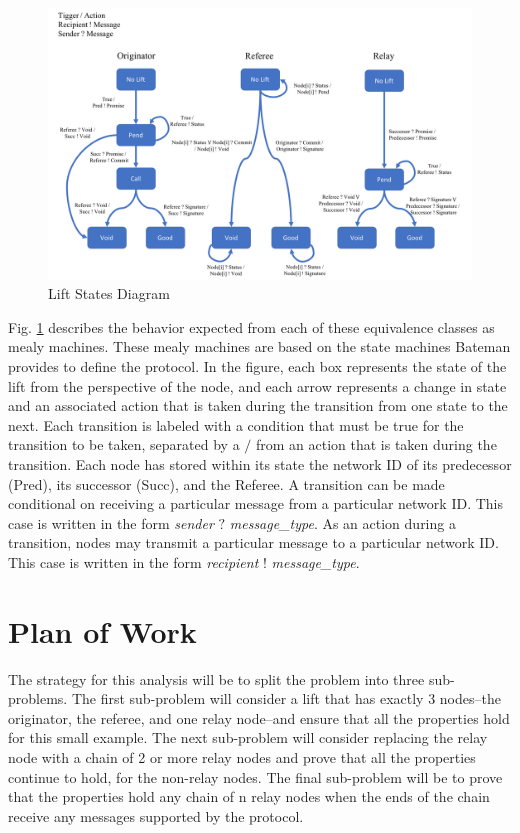 \documentclass[article, onecolumn, 12pt]{IEEEtran}
\begin{document}
\begin{figure}
    \centering
    \includegraphics[scale=0.5]{LiftStatesSeperate.png}
    \caption{Lift States Diagram}
    \label{fig:liftStates}
\end{figure}

Fig. \ref{fig:liftStates} describes the behavior expected from each of these equivalence classes as mealy machines.
These mealy machines are based on the state machines Bateman provides to define the protocol. \cite{bateman_state_machines} 
In the figure, each box represents the state of the lift from the perspective of the node, and each arrow represents a change in state and an associated action that is taken during the transition from one state to the next. Each transition is labeled with a condition that must be true for the transition to be taken, separated by a $/$ from an action that is taken during the transition. Each node has stored within its state the network ID of its predecessor (Pred), its successor (Succ), and the Referee. A transition can be made conditional on receiving a particular message from a particular network ID. This case is written in the form \emph{sender} $?$ \emph{message\_type}. As an action during a transition, nodes may transmit a particular message to a particular network ID. This case is written in the form \emph{recipient} $!$ \emph{message\_type}. 

\section{Plan of Work}

The strategy for this analysis will be to split the problem into three sub-problems. The first sub-problem will consider a lift that has exactly 3 nodes--the originator, the referee, and one relay node--and ensure that all the properties hold for this small example. The next sub-problem will consider replacing the relay node with a chain of 2 or more relay nodes and prove that all the properties continue to hold, for the non-relay nodes. The final sub-problem will be to prove that the properties hold any chain of n relay nodes when the ends of the chain receive any messages supported by the protocol. 
\end{document}
